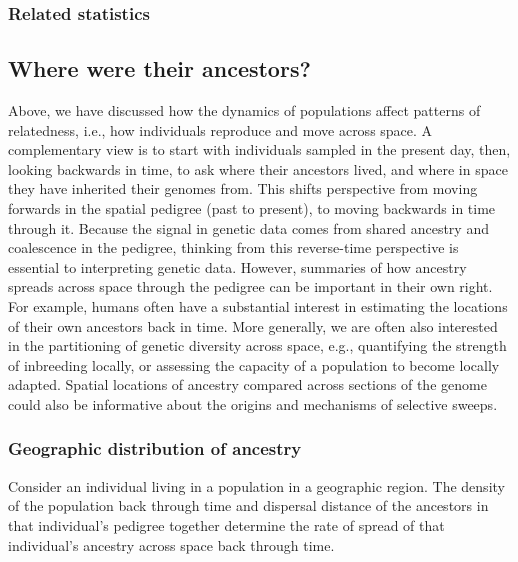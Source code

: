 \documentclass{ar-1col}
\newcommand{\plr}[1]{{\color{green}{#1}}}
\newcommand{\todo}[1]{{\textbf{\color{red}{#1}}}}
\begin{document}


\todo{tidy and conclude}

\subsubsection{Related statistics}

\todo{$m$ between "discrete pops", resistance distance}

\subsection{Where were their ancestors?}

Above, we have discussed how the dynamics of populations affect
patterns of relatedness,
i.e., how individuals reproduce and move across space.
A complementary view is to
start with individuals sampled in the present day,
then, looking backwards in time,
to ask where their ancestors lived,
and where in space they have inherited their genomes from.
This shifts perspective from moving forwards in the spatial pedigree
(past to present),
to moving backwards in time through it.
Because the signal in genetic data comes from 
shared ancestry and coalescence in the pedigree,
thinking from this reverse-time perspective 
is essential to interpreting genetic data.
However, summaries of how ancestry spreads across space 
through the pedigree can be important in their own right.
For example, humans often have a substantial interest 
in estimating the locations of their own ancestors back in time.
More generally,
we are often also interested in the partitioning of genetic diversity across space,
e.g.,
quantifying the strength of inbreeding locally,
or assessing the capacity of a population to become locally adapted.
Spatial locations of ancestry compared across sections of the genome
could also be informative about the origins and mechanisms of selective sweeps.



\subsubsection{Geographic distribution of ancestry}

Consider an individual living in a population in a geographic region.
The density of the population back through time and dispersal distance of the ancestors in that individual's pedigree together
determine the rate of spread of that individual's ancestry across space back through time.
\end{document}
